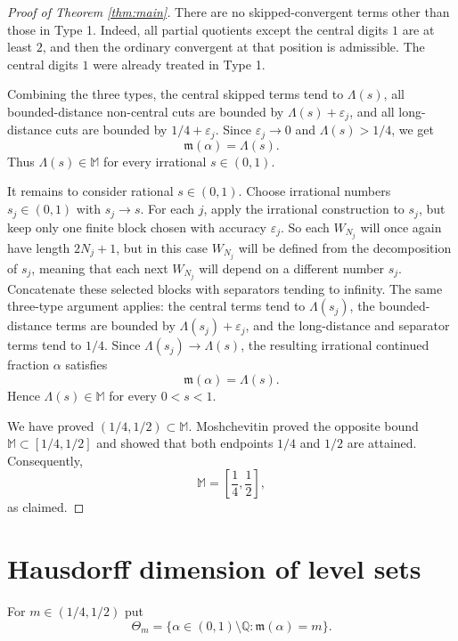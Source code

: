 \documentclass[11pt]{amsart}
\newcommand{\Q}{\mathbb Q}
\newcommand{\MS}{\mathbb M}
\begin{document}
\begin{proof}[Proof of Theorem \ref{thm:main}]
There are no skipped-convergent terms other than those in Type 1.  Indeed, all
partial quotients except the central digits $1$ are at least $2$, and then the
ordinary convergent at that position is admissible.  The central digits $1$ were
already treated in Type 1.

Combining the three types, the central skipped terms tend to $\Lambda(s)$, all
bounded-distance non-central cuts are bounded by $\Lambda(s)+\varepsilon_j$, and
all long-distance cuts are bounded by $1/4+\varepsilon_j$.  Since
$\varepsilon_j\to0$ and $\Lambda(s)>1/4$, we get
$$
        \mathfrak m(\alpha)=\Lambda(s).
$$
Thus $\Lambda(s)\in\MS$ for every irrational $s\in(0,1)$.

It remains to consider rational $s\in(0,1)$.  Choose irrational numbers
$s_j\in(0,1)$ with $s_j\to s$.  For each $j$, apply the irrational construction to $s_j$, but keep only one finite block chosen with accuracy $\varepsilon_j$. So each $W_{N_j}$ will once again have length $2N_j+1$, but in this case $W_{N_j}$ will be defined from the decomposition of $s_j$, meaning that each next $W_{N_j}$ will depend on a different number $s_j$.
Concatenate these selected blocks with separators tending to infinity.  The same three-type argument applies: the central terms tend to
$\Lambda(s_j)$, the bounded-distance terms are bounded by $\Lambda(s_j)+\varepsilon_j$, and the long-distance and separator terms tend to $1/4$.  Since $\Lambda(s_j)\to\Lambda(s)$, the resulting irrational continued
fraction $\alpha$ satisfies
$$
        \mathfrak m(\alpha)=\Lambda(s).
$$
Hence $\Lambda(s)\in\MS$ for every $0<s<1$.

We have proved $(1/4,1/2)\subset\MS$.  Moshchevitin proved the opposite bound $\MS\subset[1/4,1/2]$ and showed that both endpoints $1/4$ and $1/2$ are attained.  Consequently,
$$
        \MS=\left[\frac14,\frac12\right],
$$
as claimed.
\end{proof}




\section{Hausdorff dimension of level sets}

For $m\in(1/4,1/2)$ put
$$
        \Theta_m=\{\alpha\in(0,1)\setminus\Q:\mathfrak m(\alpha)=m\}.
$$
\end{document}
